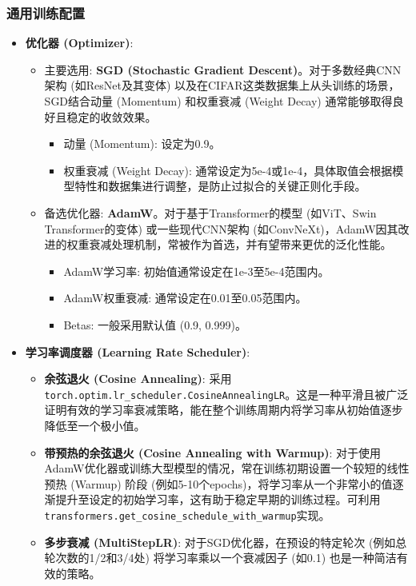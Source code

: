 \documentclass[a4paper]{article}
\begin{document}
\subsubsection{通用训练配置}
\begin{itemize}
    \item \textbf{优化器 (Optimizer)}:
    \begin{itemize}
        \item 主要选用: \textbf{SGD (Stochastic Gradient Descent)}。对于多数经典CNN架构 (如ResNet及其变体) 以及在CIFAR这类数据集上从头训练的场景，SGD结合动量 (Momentum) 和权重衰减 (Weight Decay) 通常能够取得良好且稳定的收敛效果。
        \begin{itemize}
            \item 动量 (Momentum): 设定为0.9。
            \item 权重衰减 (Weight Decay): 通常设定为5e-4或1e-4，具体取值会根据模型特性和数据集进行调整，是防止过拟合的关键正则化手段。
        \end{itemize}
        \item 备选优化器: \textbf{AdamW}。对于基于Transformer的模型 (如ViT、Swin Transformer的变体) 或一些现代CNN架构 (如ConvNeXt)，AdamW因其改进的权重衰减处理机制，常被作为首选，并有望带来更优的泛化性能。
        \begin{itemize}
            \item AdamW学习率: 初始值通常设定在1e-3至5e-4范围内。
            \item AdamW权重衰减: 通常设定在0.01至0.05范围内。
            \item Betas: 一般采用默认值 (0.9, 0.999)。
        \end{itemize}
    \end{itemize}
    \item \textbf{学习率调度器 (Learning Rate Scheduler)}:
    \begin{itemize}
        \item \textbf{余弦退火 (Cosine Annealing)}: 采用\texttt{torch.optim.lr\_scheduler.CosineAnnealingLR}。这是一种平滑且被广泛证明有效的学习率衰减策略，能在整个训练周期内将学习率从初始值逐步降低至一个极小值。
        \item \textbf{带预热的余弦退火 (Cosine Annealing with Warmup)}: 对于使用AdamW优化器或训练大型模型的情况，常在训练初期设置一个较短的线性预热 (Warmup) 阶段 (例如5-10个epochs)，将学习率从一个非常小的值逐渐提升至设定的初始学习率，这有助于稳定早期的训练过程。可利用\texttt{transformers.get\_cosine\_schedule\_with\_warmup}实现。
        \item \textbf{多步衰减 (MultiStepLR)}: 对于SGD优化器，在预设的特定轮次 (例如总轮次数的1/2和3/4处) 将学习率乘以一个衰减因子 (如0.1) 也是一种简洁有效的策略。

\end{itemize}
\end{itemize}
\end{document}
